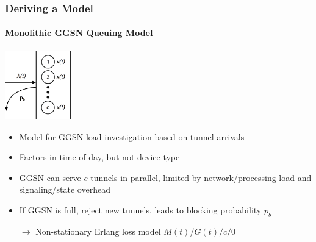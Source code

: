 \documentclass{beamer}
\begin{document}


\begin{frame}
	\frametitle{Deriving a Model}
	\framesubtitle{Monolithic GGSN Queuing Model}
		\begin{center}
			\includegraphics[height=3cm]{extras/ggsn-monolithic.png}
		\end{center}

		\begin{itemize}
			\item Model for GGSN load investigation based on tunnel arrivals
			\item Factors in time of day, but not device type
			\item GGSN can serve $c$ tunnels in parallel, limited by network/processing load and signaling/state overhead
			\item If GGSN is full, reject new tunnels, leads to blocking probability $p_b$
			\item[$\rightarrow$] Non-stationary Erlang loss model $M(t)/G(t)/c/0$ 
		\end{itemize}

\end{frame}
\end{document}
